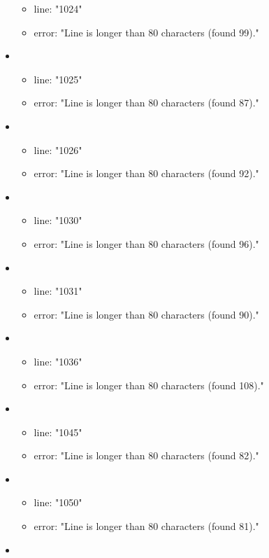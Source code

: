 \begin{itemize}
\begin{itemize}
		\item line: "1024" 
		\item error: "Line is longer than 80 characters (found 99)." 
	\end{itemize}
	\item 
	\begin{itemize} 
		\item line: "1025" 
		\item error: "Line is longer than 80 characters (found 87)." 
	\end{itemize}
	\item 
	\begin{itemize} 
		\item line: "1026" 
		\item error: "Line is longer than 80 characters (found 92)." 
	\end{itemize}
	\item 
	\begin{itemize} 
		\item line: "1030" 
		\item error: "Line is longer than 80 characters (found 96)." 
	\end{itemize}
	\item 
	\begin{itemize} 
		\item line: "1031" 
		\item error: "Line is longer than 80 characters (found 90)." 
	\end{itemize}
	\item 
	\begin{itemize} 
		\item line: "1036" 
		\item error: "Line is longer than 80 characters (found 108)." 
	\end{itemize}
	\item 
	\begin{itemize} 
		\item line: "1045" 
		\item error: "Line is longer than 80 characters (found 82)." 
	\end{itemize}
	\item 
	\begin{itemize} 
		\item line: "1050" 
		\item error: "Line is longer than 80 characters (found 81)." 
	\end{itemize}
	\item 
	\begin{itemize} 

\end{itemize}
\end{itemize}
